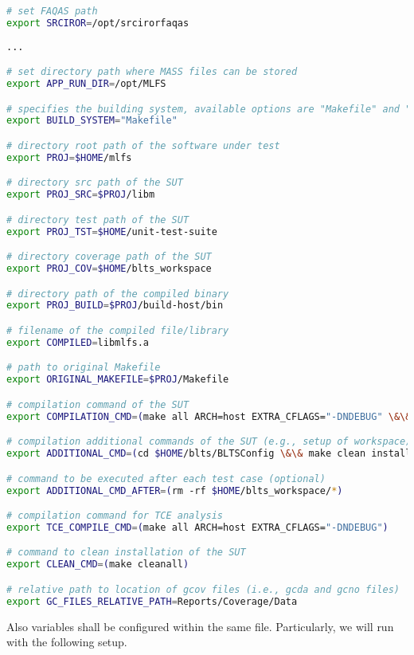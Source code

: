 \begin{lstlisting}[language=bash]
# set FAQAS path
export SRCIROR=/opt/srcirorfaqas
                                                     
...

# set directory path where MASS files can be stored
export APP_RUN_DIR=/opt/MLFS

# specifies the building system, available options are "Makefile" and "waf"
export BUILD_SYSTEM="Makefile"

# directory root path of the software under test
export PROJ=$HOME/mlfs

# directory src path of the SUT
export PROJ_SRC=$PROJ/libm

# directory test path of the SUT
export PROJ_TST=$HOME/unit-test-suite

# directory coverage path of the SUT
export PROJ_COV=$HOME/blts_workspace

# directory path of the compiled binary
export PROJ_BUILD=$PROJ/build-host/bin

# filename of the compiled file/library
export COMPILED=libmlfs.a

# path to original Makefile
export ORIGINAL_MAKEFILE=$PROJ/Makefile

# compilation command of the SUT
export COMPILATION_CMD=(make all ARCH=host EXTRA_CFLAGS="-DNDEBUG" \&\& make all COVERAGE="true" ARCH=host_cov EXTRA_CFLAGS="-DNDEBUG")

# compilation additional commands of the SUT (e.g., setup of workspace)
export ADDITIONAL_CMD=(cd $HOME/blts/BLTSConfig \&\& make clean install INSTALL_PATH="$HOME/blts_install" \&\& cd $HOME/blts_workspace \&\& $HOME/blts_install/bin/blts_app --init)

# command to be executed after each test case (optional)
export ADDITIONAL_CMD_AFTER=(rm -rf $HOME/blts_workspace/*)

# compilation command for TCE analysis
export TCE_COMPILE_CMD=(make all ARCH=host EXTRA_CFLAGS="-DNDEBUG")

# command to clean installation of the SUT
export CLEAN_CMD=(make cleanall)

# relative path to location of gcov files (i.e., gcda and gcno files)
export GC_FILES_RELATIVE_PATH=Reports/Coverage/Data
\end{lstlisting}

Also \MASS variables shall be configured within the same file. Particularly, we will run \MASS with the following setup. 

